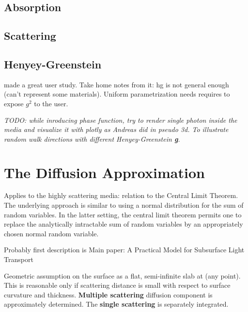 \subsection{Absorption}
\subsection{Scattering}

\subsection{Henyey-Greenstein}
\cite{Gkioulekas:2013:IVR:2508363.2508377} made a great user study.
Take home notes from it: \gls{hg} is not general enough (can't represent some
materials). Uniform parametrization needs requires to expose $g^2$ to the user.

\emph{TODO: while inroducing phase function, try to render single photon inside
the media and visualize it with plotly as Andreas did in pseudo 3d. To illustrate
random walk directions with different Henyey-Greenstein \textbf{g}.}

\section{The Diffusion Approximation}
Applies to the highly scattering media: relation to the Central Limit Theorem.
The underlying approach is similar to using a normal distribution for the sum of
random variables.
In the latter setting, the central limit theorem permits one to replace the analytically intractable sum of random variables by
an appropriately chosen normal random variable.

Probably first description is \cite{Stam1995}
Main paper: A Practical Model for Subsurface Light Transport \cite{Jensen:2001:PMS:383259.383319}

Geometric assumption on the surface as a flat, semi-infinite slab at (any
point). This is reasonable only if scattering distance is small with respect to
surface curvature and thickness. \textbf{Multiple scattering} diffusion
component is approximately determined. The \textbf{single scattering} is
separately integrated.
